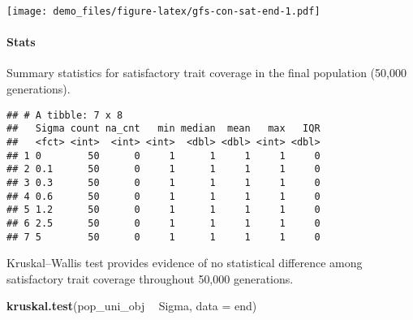 \documentclass[]{book}
\newenvironment{Shaded}{\begin{snugshade}}{\end{snugshade}}
\newcommand{\DataTypeTok}[1]{\textcolor[rgb]{0.13,0.29,0.53}{#1}}
\newcommand{\KeywordTok}[1]{\textcolor[rgb]{0.13,0.29,0.53}{\textbf{#1}}}
\newcommand{\NormalTok}[1]{#1}
\newcommand{\OperatorTok}[1]{\textcolor[rgb]{0.81,0.36,0.00}{\textbf{#1}}}
\newcommand{\OtherTok}[1]{\textcolor[rgb]{0.56,0.35,0.01}{#1}}
\newcommand{\StringTok}[1]{\textcolor[rgb]{0.31,0.60,0.02}{#1}}
\let\oldparagraph\paragraph
\renewcommand{\paragraph}[1]{\oldparagraph{#1}\mbox{}}
\begin{document}
\texttt{[image: demo\_files/figure-latex/gfs-con-sat-end-1.pdf]}

\hypertarget{stats-44}{%
\paragraph{Stats}\label{stats-44}}

Summary statistics for satisfactory trait coverage in the final population (50,000 generations).

\begin{Shaded}
\end{Shaded}

\begin{verbatim}
## # A tibble: 7 x 8
##   Sigma count na_cnt   min median  mean   max   IQR
##   <fct> <int>  <int> <int>  <dbl> <dbl> <int> <dbl>
## 1 0        50      0     1      1     1     1     0
## 2 0.1      50      0     1      1     1     1     0
## 3 0.3      50      0     1      1     1     1     0
## 4 0.6      50      0     1      1     1     1     0
## 5 1.2      50      0     1      1     1     1     0
## 6 2.5      50      0     1      1     1     1     0
## 7 5        50      0     1      1     1     1     0
\end{verbatim}

Kruskal--Wallis test provides evidence of no statistical difference among satisfactory trait coverage throughout 50,000 generations.

\begin{Shaded}
\begin{Highlighting}[]
\KeywordTok{kruskal.test}\NormalTok{(pop_uni_obj }\OperatorTok{~}\StringTok{ }\NormalTok{Sigma, }\DataTypeTok{data =}\NormalTok{ end)}
\end{Highlighting}
\end{Shaded}
\end{document}
